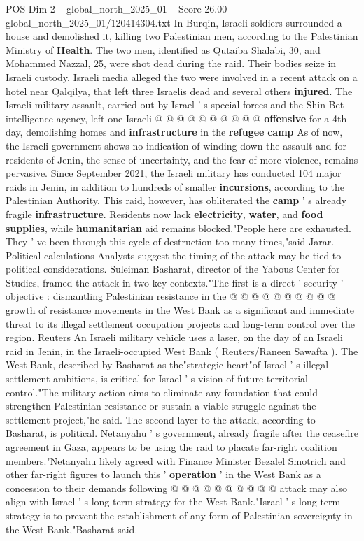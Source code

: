 \begin{textsample}{POS Dim 2 – global\_north\_2025\_01 – Score 26.00 – global\_north\_2025\_01/120414304.txt}
In Burqin, Israeli soldiers surrounded a house and demolished it, killing two Palestinian men, according to the Palestinian Ministry of \textbf{Health}.
The two men, identified as Qutaiba Shalabi, 30, and Mohammed Nazzal, 25, were shot dead during the raid.
Their bodies seize in Israeli custody.
Israeli media alleged the two were involved in a recent attack on a hotel near Qalqilya, that left three Israelis dead and several others \textbf{injured}.
The Israeli military assault, carried out by Israel ' s special forces and the Shin Bet intelligence agency, left one Israeli @ @ @ @ @ @ @ @ @ @ \textbf{offensive} for a 4th day, demolishing homes and \textbf{infrastructure} in the \textbf{refugee} \textbf{camp} As of now, the Israeli government shows no indication of winding down the assault and for residents of Jenin, the sense of uncertainty, and the fear of more violence, remains pervasive.
Since September 2021, the Israeli military has conducted 104 major raids in Jenin, in addition to hundreds of smaller \textbf{incursions}, according to the Palestinian Authority.
This raid, however, has obliterated the \textbf{camp} ' s already fragile \textbf{infrastructure}.
Residents now lack \textbf{electricity}, \textbf{water}, and \textbf{food} \textbf{supplies}, while \textbf{humanitarian} aid remains blocked."People here are exhausted.
They ' ve been through this cycle of destruction too many times,"said Jarar.
Political calculations Analysts suggest the timing of the attack may be tied to political considerations.
Suleiman Basharat, director of the Yabous Center for Studies, framed the attack in two key contexts."The first is a direct ' security ' objective : dismantling Palestinian resistance in the @ @ @ @ @ @ @ @ @ @ growth of resistance movements in the West Bank as a significant and immediate threat to its illegal settlement occupation projects and long-term control over the region.
Reuters An Israeli military vehicle uses a laser, on the day of an Israeli raid in Jenin, in the Israeli-occupied West Bank ( Reuters/Raneen Sawafta ).
The West Bank, described by Basharat as the"strategic heart"of Israel ' s illegal settlement ambitions, is critical for Israel ' s vision of future territorial control."The military action aims to eliminate any foundation that could strengthen Palestinian resistance or sustain a viable struggle against the settlement project,"he said.
The second layer to the attack, according to Basharat, is political.
Netanyahu ' s government, already fragile after the ceasefire agreement in Gaza, appears to be using the raid to placate far-right coalition members."Netanyahu likely agreed with Finance Minister Bezalel Smotrich and other far-right figures to launch this ' \textbf{operation} ' in the West Bank as a concession to their demands following @ @ @ @ @ @ @ @ @ @ attack may also align with Israel ' s long-term strategy for the West Bank."Israel ' s long-term strategy is to prevent the establishment of any form of Palestinian sovereignty in the West Bank,"Basharat said.

\end{textsample}
